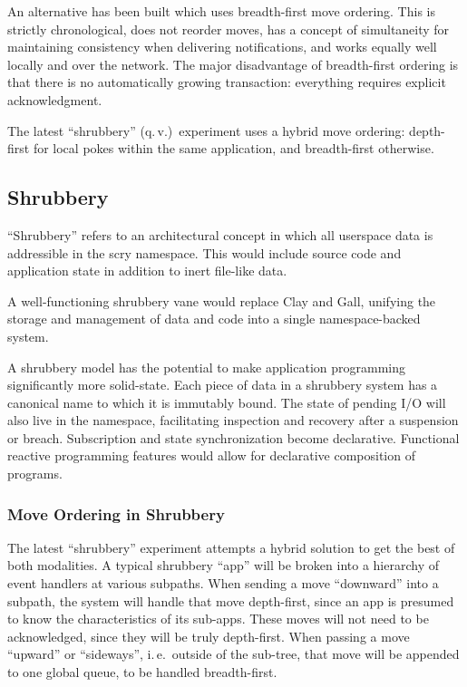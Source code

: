 \documentclass[twoside]{article}
\begin{document}
An alternative has been built which uses breadth-first move ordering.  This is strictly chronological, does not reorder moves, has a concept of simultaneity for maintaining consistency when delivering notifications, and works equally well locally and over the network.  The major disadvantage of breadth-first ordering is that there is no automatically growing transaction: everything requires explicit acknowledgment.

The latest ``shrubbery'' (q.\,v.)\ experiment uses a hybrid move ordering: depth-first for local pokes within the same application, and breadth-first otherwise.

\subsection{Shrubbery}

``Shrubbery'' refers to an architectural concept in which all user\-space data is addressible in the scry namespace.  This would include source code and application state in addition to inert file-like data.

A well-functioning shrubbery vane would replace Clay and Gall, unifying the storage and management of data and code into a single namespace-backed system.

A shrubbery model has the potential to make application programming significantly more solid-state.  Each piece of data in a shrubbery system has a canonical name to which it is immutably bound.  The state of pending I/O will also live in the namespace, facilitating inspection and recovery after a suspension or breach.  Subscription and state synchronization become declarative.  Functional reactive programming features would allow for declarative composition of programs.

\subsubsection{Move Ordering in Shrubbery}

The latest ``shrubbery'' experiment attempts a hybrid solution to get the best of both modalities.  A typical shrubbery ``app'' will be broken into a hierarchy of event handlers at various subpaths.  When sending a move ``downward'' into a subpath, the system will handle that move depth-first, since an app is presumed to know the characteristics of its sub-apps.  These moves will not need to be acknowledged, since they will be truly depth-first.  When passing a move ``upward'' or ``sideways'', i.\,e.\ outside of the sub-tree, that move will be appended to one global queue, to be handled breadth-first.
\end{document}
